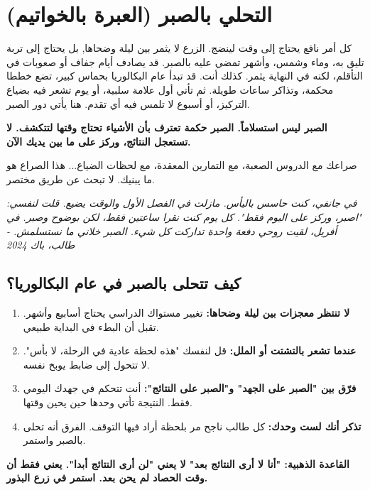 \documentclass[12pt,a4paper]{book}
\newcommand{\quoteAr}[1]{%
	\begin{myquote}
		\itshape #1
	\end{myquote}
}
\newcommand{\importantAr}[1]{%
	\begin{important}
		\bfseries #1
	\end{important}
}
\begin{document}
	\section{التحلي بالصبر (العبرة بالخواتيم)}
	\label{sec:patience}
	
	
	كل أمر نافع يحتاج إلى وقت لينضج. الزرع لا يثمر بين ليلة وضحاها, بل يحتاج إلى تربة تليق به، وماء وشمس، وأشهر تمضي عليه بالصبر. قد يصادف أيام جفاف أو صعوبات في التأقلم، لكنه في النهاية يثمر. كذلك أنت. قد تبدأ عام البكالوريا بحماس كبير، تضع خططا محكمة، وتذاكر ساعات طويلة. ثم تأتي أول علامة سلبية، أو يوم تشعر فيه بضياع التركيز، أو أسبوع لا تلمس فيه أي تقدم. هنا يأتي دور الصبر.

	\importantAr{الصبر ليس استسلاماً. الصبر حكمة تعترف بأن الأشياء تحتاج وقتها لتتكشف. لا تستعجل النتائج، وركز على ما بين يديك الآن.}
	
	صراعك مع الدروس الصعبة، مع التمارين المعقدة، مع لحظات الضياع... هذا الصراع هو ما يبنيك. لا تبحث عن طريق مختصر.
	
	\quoteAr{في جانفي، كنت حاسس باليأس. مازلت في الفصل الأول والوقت يضيع. قلت لنفسي: "اصبر، وركز على اليوم فقط". كل يوم كنت نقرا ساعتين فقط، لكن بوضوح وصبر. في أفريل، لقيت روحي دفعة واحدة تداركت كل شيء. الصبر خلاني ما نستسلمش. - طالب، باك 2024}
	
	\subsection{كيف تتحلى بالصبر في عام البكالوريا؟}
	
	\begin{enumerate}
		\item \textbf{لا تنتظر معجزات بين ليلة وضحاها:} تغيير مستواك الدراسي يحتاج أسابيع وأشهر. تقبل أن البطء في البداية طبيعي.
		\item \textbf{عندما تشعر بالتشتت أو الملل:} قل لنفسك "هذه لحظة عادية في الرحلة، لا بأس". لا تتحول إلى ضابط يوبخ نفسه.
		\item \textbf{فرّق بين "الصبر على الجهد" و"الصبر على النتائج":} أنت تتحكم في جهدك اليومي فقط. النتيجة تأتي وحدها حين يحين وقتها.
		\item \textbf{تذكر أنك لست وحدك:} كل طالب ناجح مر بلحظة أراد فيها التوقف. الفرق أنه تحلى بالصبر واستمر.
	\end{enumerate}
	
	\importantAr{القاعدة الذهبية: "أنا لا أرى النتائج بعد" لا يعني "لن أرى النتائج أبدا". يعني فقط أن وقت الحصاد لم يحن بعد. استمر في زرع البذور.}
	
	
\end{document}

